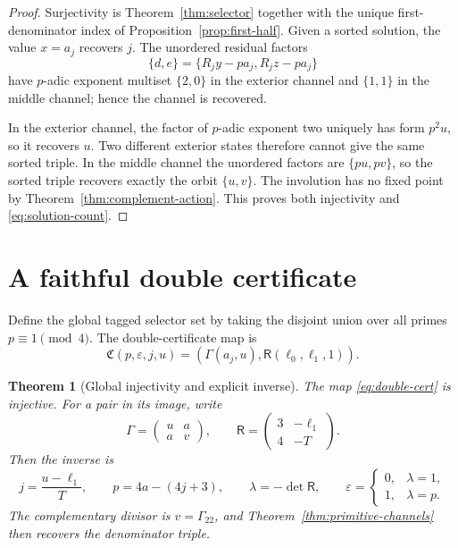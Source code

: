 \documentclass[11pt]{article}
\newtheorem{theorem}{Theorem}[section]
\theoremstyle{definition}
\theoremstyle{remark}
\begin{document}
\begin{proof}
Surjectivity is Theorem~\ref{thm:selector} together with the unique
first-denominator index of Proposition~\ref{prop:first-half}.  Given a sorted
solution, the value \(x=a_j\) recovers \(j\).  The unordered residual factors
\[
 \{d,e\}=\{R_jy-pa_j,R_jz-pa_j\}
\]
have \(p\)-adic exponent multiset \(\{2,0\}\) in the exterior channel and
\(\{1,1\}\) in the middle channel; hence the channel is recovered.

In the exterior channel, the factor of \(p\)-adic exponent two uniquely has
form \(p^2u\), so it recovers \(u\).  Two different exterior states therefore
cannot give the same sorted triple.  In the middle channel the unordered
factors are \(\{pu,pv\}\), so the sorted triple recovers exactly the orbit
\(\{u,v\}\).  The involution has no fixed point by
Theorem~\ref{thm:complement-action}.  This proves both injectivity and
\eqref{eq:solution-count}.
\end{proof}

\section{A faithful double certificate}

Define the global tagged selector set by taking the disjoint union over all
primes $p\equiv1\pmod4$.  The double-certificate map is
\begin{equation}\label{eq:double-cert}
 \mathfrak C(p,\varepsilon,j,u)
 =\left(
 \Gamma(a_j,u),
 \mathsf R(\ell_0,\ell_1,1)
 \right).
\end{equation}

\begin{theorem}[Global injectivity and explicit inverse]\label{thm:faithful}
The map \eqref{eq:double-cert} is injective.  For a pair in its image, write
\[
 \Gamma=\begin{pmatrix}u&a\\a&v\end{pmatrix},
 \qquad
 \mathsf R=\begin{pmatrix}3&-\ell_1\\4&-T\end{pmatrix}.
\]
Then the inverse is
\begin{equation}\label{eq:faithful-inverse}
 j=\frac{u-\ell_1}{T},
 \qquad
 p=4a-(4j+3),
 \qquad
 \lambda=-\det\mathsf R,
 \qquad
 \varepsilon=
 \begin{cases}0,&\lambda=1,\\1,&\lambda=p.\end{cases}
\end{equation}
The complementary divisor is $v=\Gamma_{22}$, and
Theorem~\ref{thm:primitive-channels} then recovers the denominator triple.
\end{theorem}
\end{document}
